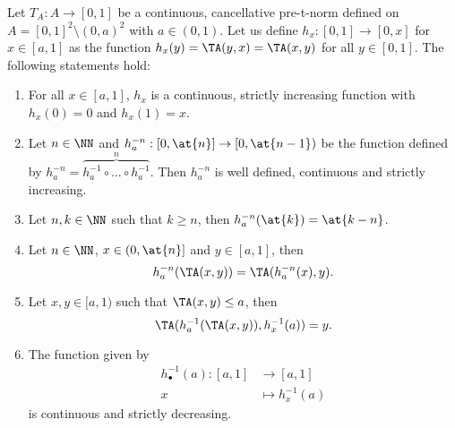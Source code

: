 \begin{lemma}\label{lemma:can:Region3}
	Let $T_A: A \to [0,1]$ be a continuous, cancellative pre-t-norm defined on $A=[0,1]^2 \setminus (0,a)^2$ with $a \in (0,1)$. Let us define $h_x:[0,1] \to [0,x]$ for $x \in [a,1]$ as the function $h_x(y)=\TA(y,x)=\TA(x,y)$ for all $y \in [0,1]$. The following statements hold:
	\begin{enumerate}[label=(\roman*)]
		\item For all $x \in [a,1]$, $h_x$ is a continuous, strictly increasing function with $h_x(0)=0$ and $h_x(1)=x$.
		\item Let $n \in \NN$ and $h_a^{-n}:[0,\at{n}] \to [0,\at{n-1})$ be the function defined by $h_a^{-n} = \overbrace{h_a ^{-1} \circ \dots \circ h_a^{-1}}^n$. Then $h_a^{-n}$ is well defined, continuous and strictly increasing.
		\item Let $n,k \in \NN$ such that $k \geq n$, then $h_a^{-n}(\at{k}) = \at{k-n}$.
		\item Let $n \in \NN$, $x \in (0,\at{n}]$ and $y \in [a,1]$, then
		\begin{equation}\label{eq:can:(0,a):propha1}
		h_a^{-n}(\TA(x,y))=\TA(h_a^{-n}(x),y).
		\end{equation}
		\item Let $x,y \in [a,1)$ such that $\TA(x,y) \leq a$, then
		\begin{equation}\label{eq:can:(0,a):propha2}
		\TA(h_a^{-1}(\TA(x,y)),h_x^{-1}(a))=y.
		\end{equation}
		\item The function given by
			\begin{align*}
			h_{\bullet}^{-1}(a) \colon [a,1] &\to [a,1]\\
			x &\mapsto h_x^{-1}(a)
		\end{align*}
		is continuous and strictly decreasing.	
	\end{enumerate}
\end{lemma}

